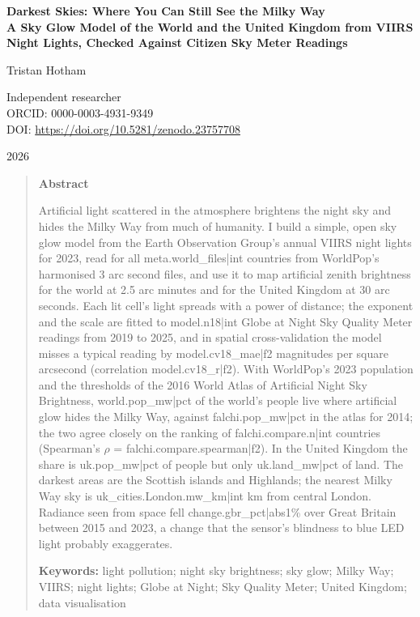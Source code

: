 \documentclass[11pt,a4paper]{article}
\begin{document}
\begin{center}
{\Large\bfseries Darkest Skies: Where You Can Still See the Milky Way\\[2pt] A Sky Glow Model of the World and the United Kingdom from VIIRS Night Lights, Checked Against Citizen Sky Meter Readings\par}
\vspace{1.2em}
{\large Tristan Hotham\par}
\vspace{0.3em}
{\small Independent researcher\\
ORCID: 0000-0003-4931-9349\\
DOI: \href{https://doi.org/10.5281/zenodo.23757708}{https://doi.org/10.5281/zenodo.23757708}\par}
\vspace{0.8em}
2026
\end{center}

\begin{quote}
\small
\begin{center}\textbf{Abstract}\end{center}
Artificial light scattered in the atmosphere brightens the night sky and hides the Milky Way from much of humanity. I build a simple, open sky glow model from the Earth Observation Group's annual VIIRS night lights for 2023, read for all {{meta.world_files|int}} countries from WorldPop's harmonised 3 arc second files, and use it to map artificial zenith brightness for the world at 2.5 arc minutes and for the United Kingdom at 30 arc seconds. Each lit cell's light spreads with a power of distance; the exponent and the scale are fitted to {{model.n18|int}} Globe at Night Sky Quality Meter readings from 2019 to 2025, and in spatial cross-validation the model misses a typical reading by {{model.cv18_mae|f2}} magnitudes per square arcsecond (correlation {{model.cv18_r|f2}}). With WorldPop's 2023 population and the thresholds of the 2016 World Atlas of Artificial Night Sky Brightness, {{world.pop_mw|pct}} of the world's people live where artificial glow hides the Milky Way, against {{falchi.pop_mw|pct}} in the atlas for 2014; the two agree closely on the ranking of {{falchi.compare.n|int}} countries (Spearman's $\rho$ = {{falchi.compare.spearman|f2}}). In the United Kingdom the share is {{uk.pop_mw|pct}} of people but only {{uk.land_mw|pct}} of land. The darkest areas are the Scottish islands and Highlands; the nearest Milky Way sky is {{uk_cities.London.mw_km|int}} km from central London. Radiance seen from space fell {{change.gbr_pct|abs1}}\% over Great Britain between 2015 and 2023, a change that the sensor's blindness to blue LED light probably exaggerates.

\textbf{Keywords:} light pollution; night sky brightness; sky glow; Milky Way; VIIRS; night lights; Globe at Night; Sky Quality Meter; United Kingdom; data visualisation
\end{quote}
\end{document}
